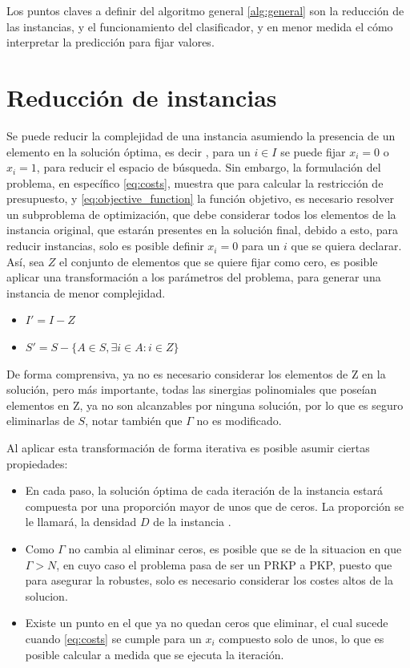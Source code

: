 \documentclass[spanish, a4paper, 12pt, openany,final]{book}
\begin{document}
Los puntos claves a definir del algoritmo general \ref{alg:general} son la reducción de las instancias, y el funcionamiento del clasificador, y en menor medida el cómo interpretar la predicción para fijar valores.





\section{Reducción de instancias}

Se puede reducir la complejidad de una instancia asumiendo la presencia de un elemento en la solución óptima, es decir , para un $i \in I$ se puede fijar $x_i=0$ o $x_i = 1$, para reducir el espacio de búsqueda. Sin embargo, la formulación del problema, en específico \ref{eq:costs}, muestra que para calcular la restricción de presupuesto, y \ref{eq:objective_function} la función objetivo, es necesario resolver un subproblema de optimización, que debe considerar todos los elementos de la instancia original, que estarán presentes en la solución final, debido a esto, para reducir instancias, solo es posible definir $x_i=0$ para un $i$ que se quiera declarar. Así, sea $Z$ el conjunto de elementos que se quiere fijar como cero, es posible aplicar una transformación a los parámetros del problema, para generar una instancia de menor complejidad.
	
\begin{itemize}
	\item $I' = I - Z$
	\item $S' = S - \{A \in S, \exists i \in A: i \in Z\} $
\end{itemize}

De forma comprensiva, ya no es necesario considerar los elementos de Z en la solución, pero más importante,
todas las sinergias polinomiales que poseían elementos en Z, ya no son alcanzables por ninguna solución, por lo que es seguro eliminarlas de $S$, notar también que $\Gamma$ no es modificado.

Al aplicar esta transformación de forma iterativa es posible asumir ciertas propiedades:


\begin{itemize}
\item En cada paso, la solución óptima de cada iteración de la instancia estará compuesta por una proporción mayor de unos que de ceros. La proporción se le llamará, la densidad $D$ de la instancia .

\item  Como $\Gamma$ no cambia al eliminar ceros, es posible que se de la situacion en que $\Gamma > N$, en cuyo caso el problema pasa de ser un PRKP a PKP, puesto que para asegurar la robustes, solo es necesario considerar los costes altos de la solucion.

\item  Existe un punto en el que ya no quedan ceros que eliminar, el cual sucede cuando \ref{eq:costs} se cumple para un $x_i$ compuesto solo de unos, lo que es posible calcular a medida que se ejecuta la iteración.
\end{itemize}
\end{document}
